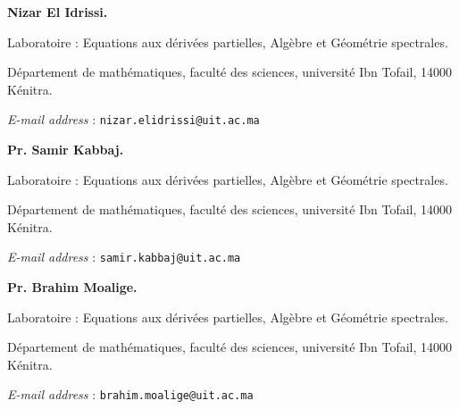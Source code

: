 \documentclass[a4paper,12pt]{article}
\makeatletter
\newcommand{\Addresses}{{%
  \bigskip
  \footnotesize

  \textbf{Nizar El Idrissi.}
  \par\nopagebreak Laboratoire : Equations aux dérivées partielles, Algèbre et Géométrie spectrales.
  \par\nopagebreak
  Département de mathématiques, faculté des sciences, université Ibn Tofail, 14000 Kénitra.\par\nopagebreak 
  \textit{E-mail address} : \texttt{nizar.elidrissi@uit.ac.ma}

  \medskip

  \textbf{Pr. Samir Kabbaj.} \par\nopagebreak Laboratoire : Equations aux dérivées partielles, Algèbre et Géométrie spectrales.
  \par\nopagebreak
  Département de mathématiques, faculté des sciences, université Ibn Tofail, 14000 Kénitra.\par\nopagebreak 
  \textit{E-mail address} : \texttt{samir.kabbaj@uit.ac.ma}
  
  \medskip
  
  \textbf{Pr. Brahim Moalige.}
  \par\nopagebreak Laboratoire : Equations aux dérivées partielles, Algèbre et Géométrie spectrales.
  \par\nopagebreak
  Département de mathématiques, faculté des sciences, université Ibn Tofail, 14000 Kénitra.\par\nopagebreak 
  \textit{E-mail address} : \texttt{brahim.moalige@uit.ac.ma}
}}
\theoremstyle{plain}
\theoremstyle{definition}
\theoremstyle{remark}
\makeatother
\begin{document}

\Addresses
\end{document}
